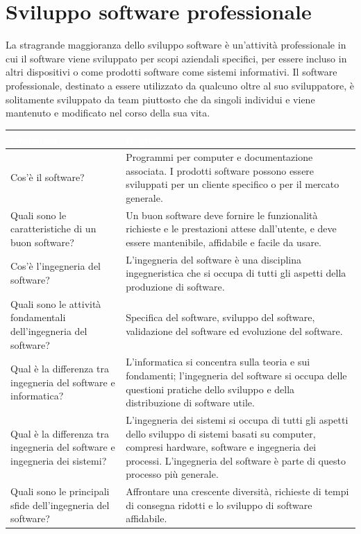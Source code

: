 \section{Sviluppo software professionale}
La stragrande maggioranza dello sviluppo software è un'attività professionale in cui il software viene sviluppato per scopi aziendali specifici, per essere incluso in altri dispositivi o come prodotti software come sistemi informativi. Il software professionale, destinato a essere utilizzato da qualcuno oltre al suo sviluppatore, è solitamente sviluppato da team piuttosto che da singoli individui e viene mantenuto e modificato nel corso della sua vita.

\begin{table}[ht]
\centering
{}
\begin{tabular}{|p{6cm}|p{9cm}|}
\hline
\rowcolor{headerblue}
\textbf{\textcolor{white}{Domanda}} & \textbf{\textcolor{white}{Risposta}} \\
\hline
Cos'è il software? & Programmi per computer e documentazione associata. I prodotti software possono essere sviluppati per un cliente specifico o per il mercato generale. \\
\hline
Quali sono le caratteristiche di un buon software? & Un buon software deve fornire le funzionalità richieste e le prestazioni attese dall'utente, e deve essere mantenibile, affidabile e facile da usare. \\
\hline
Cos'è l'ingegneria del software? & L'ingegneria del software è una disciplina ingegneristica che si occupa di tutti gli aspetti della produzione di software. \\
\hline
Quali sono le attività fondamentali dell'ingegneria del software? & Specifica del software, sviluppo del software, validazione del software ed evoluzione del software. \\
\hline
Qual è la differenza tra ingegneria del software e informatica? & L'informatica si concentra sulla teoria e sui fondamenti; l'ingegneria del software si occupa delle questioni pratiche dello sviluppo e della distribuzione di software utile. \\
\hline
Qual è la differenza tra ingegneria del software e ingegneria dei sistemi? & L'ingegneria dei sistemi si occupa di tutti gli aspetti dello sviluppo di sistemi basati su computer, compresi hardware, software e ingegneria dei processi. L'ingegneria del software è parte di questo processo più generale. \\
\hline
Quali sono le principali sfide dell'ingegneria del software? & Affrontare una crescente diversità, richieste di tempi di consegna ridotti e lo sviluppo di software affidabile. \\

\end{tabular}
\end{table}
